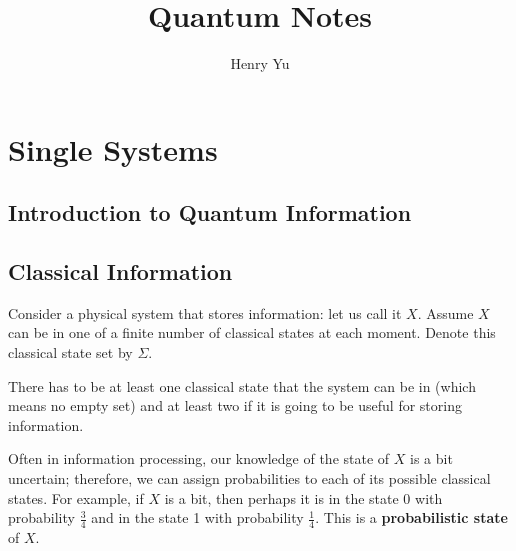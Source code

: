 \documentclass{report}
\title{\Huge{Quantum Notes}}
\author{\huge{Henry Yu}}
\date{}
\begin{document}
\raggedright


\maketitle
\newpage
{}
\tableofcontents
\pagebreak

\chapter{Single Systems}
\section{Introduction to Quantum Information}

\section{Classical Information}
Consider a physical system that stores information: let us call it $X$. Assume $X$ can be in one of a finite number of classical states at each moment. Denote this classical state set by $\Sigma$.

There has to be at least one classical state that the system can be in (which means no empty set) and at least two if it is going to be useful for storing information.

\bigbreak

Often in information processing, our knowledge of the state of $X$ is a bit uncertain; therefore, we can assign probabilities to each of its possible classical states. For example, if $X$ is a bit, then perhaps it is in the state 0 with probability $\frac{3}{4}$ and in the state 1 with probability $\frac{1}{4}$. This is a \textbf{probabilistic state} of $X$.
\end{document}
